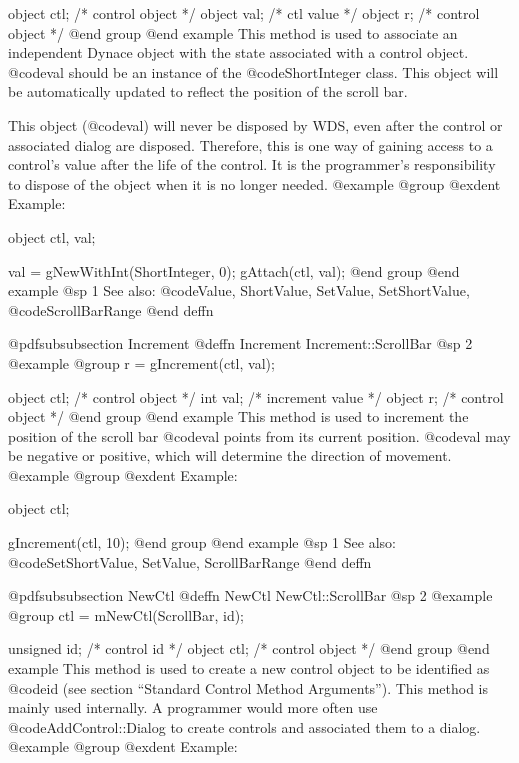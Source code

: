 object  ctl;   /*  control object  */
object  val;   /*  ctl value       */
object  r;     /*  control object  */
@end group
@end example
This method is used to associate an independent Dynace object with the
state associated with a control object.  @code{val} should be an
instance of the @code{ShortInteger} class.  This object will be
automatically updated to reflect the position of the scroll bar.

This object (@code{val}) will never be disposed by WDS, even after
the control or associated dialog are disposed.  Therefore, this
is one way of gaining access to a control's value after the life
of the control.  It is the programmer's responsibility to dispose of
the object when it is no longer needed.
@example
@group
@exdent Example:

object  ctl, val;

val = gNewWithInt(ShortInteger, 0);
gAttach(ctl, val);
@end group
@end example
@sp 1
See also:  @code{Value, ShortValue, SetValue, SetShortValue,}
        @code{ScrollBarRange}
@end deffn










@pdfsubsubsection {Increment}
@deffn {Increment} Increment::ScrollBar
@sp 2
@example
@group
r = gIncrement(ctl, val);

object  ctl;   /*  control object  */
int     val;   /*  increment value */
object  r;     /*  control object  */
@end group
@end example
This method is used to increment the position of the scroll bar
@code{val} points from its current position.  @code{val} may
be negative or positive, which will determine the direction of movement.
@example
@group
@exdent Example:

object  ctl;

gIncrement(ctl, 10);
@end group
@end example
@sp 1
See also:  @code{SetShortValue, SetValue, ScrollBarRange}
@end deffn











@pdfsubsubsection {NewCtl}
@deffn {NewCtl} NewCtl::ScrollBar
@sp 2
@example
@group
ctl = mNewCtl(ScrollBar, id);

unsigned  id;   /*  control id      */
object   ctl;   /*  control object  */
@end group
@end example
This method is used to create a new control object to be identified as
@code{id} (see section ``Standard Control Method Arguments'').  This
method is mainly used internally.  A programmer would more often
use @code{AddControl::Dialog} to create controls and associated them
to a dialog.
@example
@group
@exdent Example:

